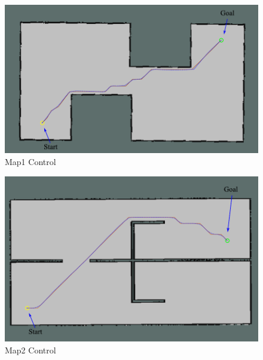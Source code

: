 \begin{figure}[H]
	\centering
	\includegraphics[scale=0.75]{images/imagess/7reslt-cntrl-map1.pdf}
	\caption{Map1 Control}
	\label{fig:Map1 Control}
\end{figure}

\begin{figure}[H]
	\centering
	\includegraphics[scale=0.75]{images/imagess/7reslt-cntrl-map2.pdf}
	\caption{Map2 Control}
	\label{fig:Map2 Control}
\end{figure}